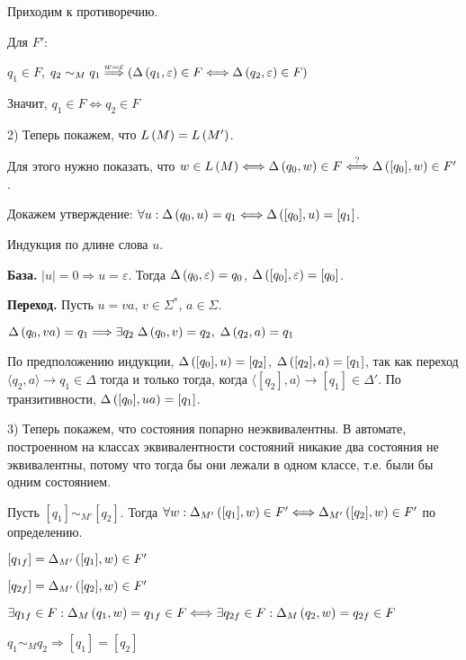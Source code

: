 Приходим к противоречию.

Для $F'$:
\begin{center}
    $q_1 \in F$, $q_2 \sim_M q_1 \overset{w = \varepsilon}{\Longrightarrow} (\Delta \left({q_1, \varepsilon}\right) \in F \Longleftrightarrow \Delta \left({q_2, \varepsilon}\right) \in F)$
    
    Значит, $q_1 \in F \Longleftrightarrow q_2 \in F$
\end{center}

2) Теперь покажем, что $L \left({M}\right) = L \left({M'}\right)$. 

Для этого нужно показать, что $w \in L \left({M}\right) \Longleftrightarrow \Delta \left({q_0, w}\right) \in F \stackrel{?}{\Longleftrightarrow} \Delta \left({[q_0], w}\right) \in F'$.

Докажем утверждение: $\forall u: \Delta \left({q_0, u}\right) = q_1 \Longleftrightarrow \Delta \left({[q_0], u}\right) = [q_1]$.

Индукция по длине слова $u$.

\textbf{База.} $|u| = 0 \Longrightarrow u = \varepsilon$. Тогда $\Delta \left({q_0, \varepsilon}\right) = q_0$, $\Delta \left({[q_0], \varepsilon}\right) = [q_0]$.

\textbf{Переход.} Пусть $u = va$, $v \in \Sigma^*$, $a \in \Sigma$.

\begin{center}
    $\Delta \left({q_0, va}\right) = q_1 \Longrightarrow \exists q_2\; \Delta \left({q_0, v}\right) = q_2, \;\Delta \left({q_2, a}\right) = q_1$
\end{center}

По предположению индукции, $\Delta \left({[q_0], u}\right) = [q_2]$, $\Delta \left({[q_2], a}\right) = [q_1]$, так как переход $\langle q_2, a \rangle \rightarrow q_1 \in \Delta$ тогда и только тогда, когда $\langle [q_2], a \rangle \rightarrow [q_1] \in \Delta'$. По транзитивности, $\Delta \left({[q_0], ua}\right) = [q_1]$.

3) Теперь покажем, что состояния попарно неэквивалентны. В автомате, построенном на классах эквивалентности состояний никакие два состояния не эквивалентны, потому что тогда бы они лежали в одном классе, т.е. были бы одним состоянием.

Пусть $[q_1] \sim_{M'} [q_2]$. Тогда $\forall w : \Delta_{M'} \left({[q_1], w}\right) \in F' \Longleftrightarrow \Delta_{M'} \left({[q_2], w}\right) \in F'$ по определению. 

\begin{center}
    $[q_{1f}] = \Delta_{M'} \left({[q_1], w}\right) \in F'$
    
    $[q_{2f}] = \Delta_{M'} \left({[q_2], w}\right) \in F'$
    
    $\exists q_{1f} \in F : \Delta_M \left({q_1, w}\right) = q_{1f} \in F \Longleftrightarrow \exists q_{2f} \in F : \Delta_M \left({q_2, w}\right) = q_{2f} \in F$
    
    $q_1 \sim_{M} q_2 \Longrightarrow [q_1] = [q_2]$
\end{center}
\begin{flushright}
  \EndProof
\end{flushright} 


